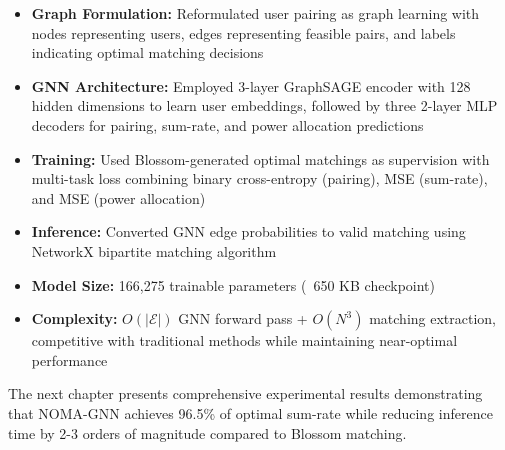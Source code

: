 \begin{itemize}
    \item \textbf{Graph Formulation:} Reformulated user pairing as graph learning with nodes representing users, edges representing feasible pairs, and labels indicating optimal matching decisions
    
    \item \textbf{GNN Architecture:} Employed 3-layer GraphSAGE encoder with 128 hidden dimensions to learn user embeddings, followed by three 2-layer MLP decoders for pairing, sum-rate, and power allocation predictions
    
    \item \textbf{Training:} Used Blossom-generated optimal matchings as supervision with multi-task loss combining binary cross-entropy (pairing), MSE (sum-rate), and MSE (power allocation)
    
    \item \textbf{Inference:} Converted GNN edge probabilities to valid matching using NetworkX bipartite matching algorithm
    
    \item \textbf{Model Size:} 166,275 trainable parameters (~650 KB checkpoint)
    
    \item \textbf{Complexity:} $O(|\mathcal{E}|)$ GNN forward pass + $O(N^3)$ matching extraction, competitive with traditional methods while maintaining near-optimal performance
\end{itemize}

The next chapter presents comprehensive experimental results demonstrating that NOMA-GNN achieves 96.5\% of optimal sum-rate while reducing inference time by 2-3 orders of magnitude compared to Blossom matching.
